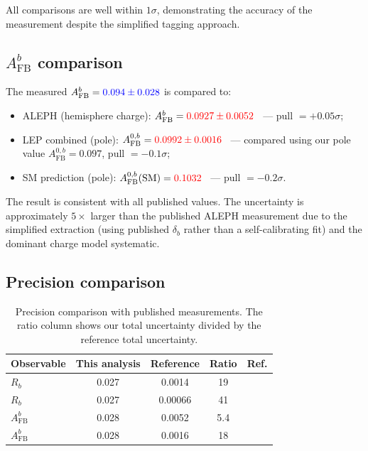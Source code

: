 \documentclass[11pt,a4paper]{article}
\newcommand{\measured}[1]{\textcolor{blue}{#1}}
\newcommand{\external}[1]{\textcolor{red}{#1}}
\begin{document}
All comparisons are well within $1\sigma$, demonstrating the accuracy of
the measurement despite the simplified tagging approach.

\subsection{$A_\mathrm{FB}^b$ comparison}

The measured $A_\mathrm{FB}^b = \measured{0.094 \pm 0.028}$ is compared to:
\begin{itemize}
\item ALEPH (hemisphere charge): $A_\mathrm{FB}^b = \external{0.0927 \pm 0.0052}$~\cite{ALEPH:AFBb} --- pull $= +0.05\sigma$;
\item LEP combined (pole): $A_\mathrm{FB}^{0,b} = \external{0.0992 \pm 0.0016}$~\cite{LEP:EWWG:2005} --- compared using our pole value $A_\mathrm{FB}^{0,b} = 0.097$, pull $= -0.1\sigma$;
\item SM prediction (pole): $A_\mathrm{FB}^{0,b}(\mathrm{SM}) = \external{0.1032}$~\cite{LEP:EWWG:2005} --- pull $= -0.2\sigma$.
\end{itemize}

The result is consistent with all published values.  The uncertainty is
approximately $5\times$ larger than the published ALEPH measurement due
to the simplified extraction (using published $\delta_b$ rather than a
self-calibrating fit) and the dominant charge model systematic.

\subsection{Precision comparison}

\begin{table}[htbp]
\centering
\caption{Precision comparison with published measurements.  The ratio
  column shows our total uncertainty divided by the reference total
  uncertainty.}
\label{tbl:precision}
\begin{tabular}{lcccc}
\toprule
Observable & This analysis & Reference & Ratio & Ref. \\
\midrule
$R_b$ & 0.027 & 0.0014 & 19 & \cite{ALEPH:Rb:1996} \\
$R_b$ & 0.027 & 0.00066 & 41 & \cite{LEP:EWWG:2005} \\
$A_\mathrm{FB}^b$ & 0.028 & 0.0052 & 5.4 & \cite{ALEPH:AFBb} \\
$A_\mathrm{FB}^b$ & 0.028 & 0.0016 & 18 & \cite{LEP:EWWG:2005} \\
\bottomrule
\end{tabular}
\end{table}
\end{document}
